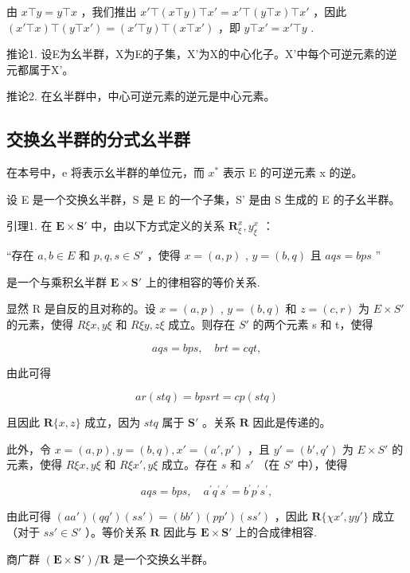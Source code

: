 由 \(x \top y = y \top x\) ，我们推出 \(x' \top (x \top y) \top x' = x' \top (y \top x) \top x'\) ，因此 \((x' \top x) \top (y \top x') = (x' \top y) \top (x \top x')\) ，即 \(y \top x' = x' \top y\) .

推论1. 设E为幺半群，X为E的子集，X'为X的中心化子。X'中每个可逆元素的逆元都属于X'。

推论2. 在幺半群中，中心可逆元素的逆元是中心元素。

\subsection{交换幺半群的分式幺半群}

在本号中，e 将表示幺半群的单位元，而 \(x^{*}\) 表示 E 的可逆元素 x 的逆。

设 E 是一个交换幺半群，S 是 E 的一个子集，S' 是由 S 生成的 E 的子幺半群。

引理1. 在 \(\mathbf{E} \times \mathbf{S}'\) 中，由以下方式定义的关系 \(\mathbf{R}_{\xi}^{x}, y_{\xi}^{x}\) ：

“存在 \(a, b \in E\) 和 \(p, q, s \in S'\) ，使得 \(x = (a, p)\) , \(y = (b, q)\) 且 \(aqs = bps\) ''

是一个与乘积幺半群 \(\mathbf{E} \times \mathbf{S}'\) 上的律相容的等价关系.

显然 R 是自反的且对称的。设 \(x = (a, p)\) , \(y = (b, q)\) 和 \(z = (c, r)\) 为 \(E \times S'\) 的元素，使得 \(R\xi x, y\xi\) 和 \(R\xi y, z\xi\) 成立。则存在 \(S'\) 的两个元素 s 和 t，使得

\[
a q s = b p s, \quad b r t = c q t,
\]

由此可得

\[
a r (s t q) = b p s r t = c p (s t q)
\]

且因此 \(\mathbf{R}\{x, z\}\) 成立，因为 \(stq\) 属于 \(\mathbf{S}'\) 。关系 \(\mathbf{R}\) 因此是传递的。

此外，令 \(x = (a, p), y = (b, q), x' = (a', p')\) ，且 \(y' = (b', q')\) 为 \(E \times S'\) 的元素，使得 \(R\xi x, y\xi\) 和 \(R\xi x', y\xi\) 成立。存在 \(s\) 和 \(s'\) （在 \(S'\) 中），使得

\[
a q s = b p s, \quad a ^ {\prime} q ^ {\prime} s ^ {\prime} = b ^ {\prime} p ^ {\prime} s ^ {\prime},
\]

由此可得 \((aa')(qq')(ss') = (bb')(pp')(ss')\) ，因此 \(\mathbf{R}\{\chi x', yy'\}\) 成立（对于 \(ss' \in S'\) ）。等价关系 \(\mathbf{R}\) 因此与 \(\mathbf{E} \times \mathbf{S}'\) 上的合成律相容.

商广群 \((\mathbf{E} \times \mathbf{S}')/\mathbf{R}\) 是一个交换幺半群。

